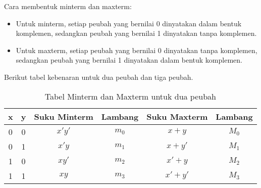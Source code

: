 \documentclass[11pt]{article}
\theoremstyle{definitionstyle}
\theoremstyle{theoremstyle}
\theoremstyle{examplestyle}
\begin{document}
\noindent Cara membentuk minterm dan maxterm:
\begin{itemize}[left=0pt, itemsep=1pt, topsep=1pt]
    \item Untuk minterm, setiap peubah yang bernilai 0 dinyatakan dalam bentuk komplemen, sedangkan peubah yang bernilai 1 dinyatakan tanpa komplemen.
    \item Untuk maxterm, setiap peubah yang bernilai 0 dinyatakan tanpa komplemen, sedangkan peubah yang bernilai 1 dinyatakan dalam bentuk komplemen.
\end{itemize}
\pagebreak
Berikut tabel kebenaran untuk dua peubah dan tiga peubah.
\begin{table}[H]
    \centering
    \begin{tabular}{|c|c|c|c|c|c|}
        \hline
        \textbf{x} & \textbf{y} & \textbf{Suku Minterm} & \textbf{Lambang} & \textbf{Suku Maxterm} & \textbf{Lambang} \\ \hline
        0          & 0          & $x'y'$           & $m_0$           & $x + y$          & $M_0$           \\ \hline
        0          & 1          & $x'y$            & $m_1$           & $x + y'$         & $M_1$           \\ \hline
        1          & 0          & $xy'$            & $m_2$           & $x' + y$         & $M_2$           \\ \hline
        1          & 1          & $xy$             & $m_3$           & $x' + y'$        & $M_3$           \\ \hline
    \end{tabular}
    \caption{Tabel Minterm dan Maxterm untuk dua peubah}
\end{table}
\end{document}
